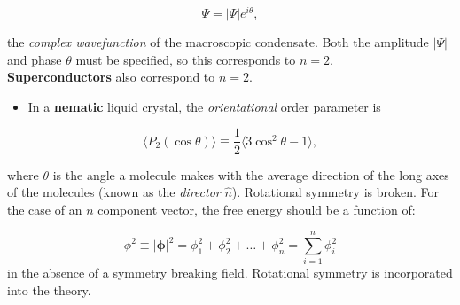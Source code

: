 \documentclass[
  letterpaper,
  enabledeprecatedfontcommands]{report}
\providecommand{\tightlist}{%
  \setlength{\itemsep}{0pt}\setlength{\parskip}{0pt}}
\begin{document}
\begin{tcolorbox}
\[
\Psi = |\Psi| e^{i\theta},
\]

the \emph{complex wavefunction} of the macroscopic condensate. Both the
amplitude \(|\Psi|\) and phase \(\theta\) must be specified, so this
corresponds to \(n = 2\).\\
\textbf{Superconductors} also correspond to \(n = 2\).

\begin{itemize}
\tightlist
\item
  In a \textbf{nematic} liquid crystal, the \emph{orientational} order
  parameter is
\end{itemize}

\[
\langle P_2(\cos \theta) \rangle \equiv \frac{1}{2}\langle 3\cos^2 \theta - 1\rangle,
\]

where \(\theta\) is the angle a molecule makes with the average
direction of the long axes of the molecules (known as the
\emph{director} \(\hat{n}\)). Rotational symmetry is broken. For the
case of an \(n\) component vector, the free energy should be a function
of:

\[
\phi^2 \equiv |\boldsymbol{\phi}|^2 = \phi_1^2 + \phi_2^2 + \dots + \phi_n^2 = \sum_{i=1}^n \phi_i^2
\] in the absence of a symmetry breaking field. Rotational symmetry is
incorporated into the theory.

\begin{figure}[H]

\begin{minipage}{0.50\linewidth}




\end{minipage}
\end{figure}
\end{tcolorbox}
\end{document}
